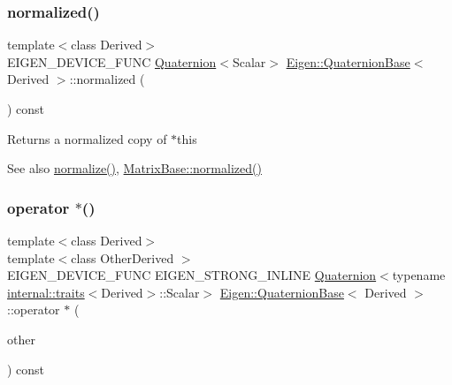 \subsubsection{\texorpdfstring{normalized()}{normalized()}}
{\footnotesize\ttfamily template$<$class Derived$>$ \\
E\+I\+G\+E\+N\+\_\+\+D\+E\+V\+I\+C\+E\+\_\+\+F\+U\+NC \mbox{\hyperlink{class_eigen_1_1_quaternion}{Quaternion}}$<$Scalar$>$ \mbox{\hyperlink{class_eigen_1_1_quaternion_base}{Eigen\+::\+Quaternion\+Base}}$<$ Derived $>$\+::normalized (\begin{DoxyParamCaption}{ }\end{DoxyParamCaption}) const\hspace{0.3cm}{\ttfamily [inline]}}

\begin{DoxyReturn}{Returns}
a normalized copy of {\ttfamily $\ast$this} 
\end{DoxyReturn}
\begin{DoxySeeAlso}{See also}
\mbox{\hyperlink{class_eigen_1_1_quaternion_base_aa8d67d855940925f634327827aed1cad}{normalize()}}, \mbox{\hyperlink{class_eigen_1_1_matrix_base_a6ede5c8ebe9631fed9004fedbf9e4016}{Matrix\+Base\+::normalized()}} 
\end{DoxySeeAlso}
\mbox{\label{class_eigen_1_1_quaternion_base_a48a3eadd7572dba8eed688278fa8868f}} 
\subsubsection{\texorpdfstring{operator $\ast$()}{operator *()}}
{\footnotesize\ttfamily template$<$class Derived$>$ \\
template$<$class Other\+Derived $>$ \\
E\+I\+G\+E\+N\+\_\+\+D\+E\+V\+I\+C\+E\+\_\+\+F\+U\+NC E\+I\+G\+E\+N\+\_\+\+S\+T\+R\+O\+N\+G\+\_\+\+I\+N\+L\+I\+NE \mbox{\hyperlink{class_eigen_1_1_quaternion}{Quaternion}}$<$typename \mbox{\hyperlink{struct_eigen_1_1internal_1_1traits}{internal\+::traits}}$<$Derived$>$\+::Scalar$>$ \mbox{\hyperlink{class_eigen_1_1_quaternion_base}{Eigen\+::\+Quaternion\+Base}}$<$ Derived $>$\+::operator $\ast$ (\begin{DoxyParamCaption}\item[{const \mbox{\hyperlink{class_eigen_1_1_quaternion_base}{Quaternion\+Base}}$<$ Other\+Derived $>$ \&}]{other }\end{DoxyParamCaption}) const}

